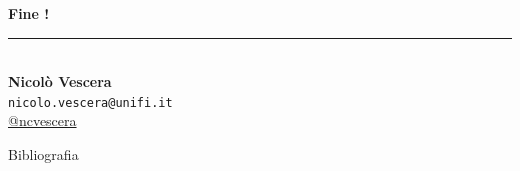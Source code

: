 \documentclass{beamer}
\begin{document}
\begin{frame}[plain]
    \centering
    \vfill
    {\LARGE \textbf{Fine !}} \\[2em]

    \rule{0.5\linewidth}{0.4pt} \\[1em]
    
    \textbf{Nicolò Vescera} \\
    \texttt{nicolo.vescera@unifi.it} \\
    \href{https://github.com/ncvescera}{@ncvescera} \\
    \vfill
\end{frame}

\begin{frame}[allowframebreaks]{Bibliografia}
    \nocite{*}
    \printbibliography[heading=none]
\end{frame}
\end{document}

